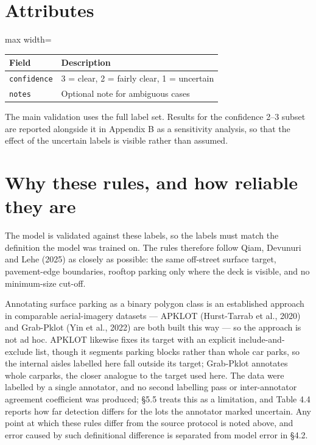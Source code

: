 \hypertarget{attributes}{%
\section{Attributes}\label{attributes}}

\begin{table}[htbp]
\centering
\begin{adjustbox}{max width=\textwidth}
\begin{tabular}{@{}ll@{}}
\toprule
Field & Description \\
\midrule
\texttt{confidence} & 3 = clear, 2 = fairly clear, 1 = uncertain \\
\texttt{notes} & Optional note for ambiguous cases \\
\bottomrule
\end{tabular}
\end{adjustbox}
\end{table}
\restoreparskip

The main validation uses the full label set. Results for the confidence 2--3 subset are reported alongside it in Appendix B as a sensitivity analysis, so that the effect of the uncertain labels is visible rather than assumed.

\hypertarget{why-these-rules-and-how-reliable-they-are}{%
\section{Why these rules, and how reliable they are}\label{why-these-rules-and-how-reliable-they-are}}

The model is validated against these labels, so the labels must match the definition the model was trained on. The rules therefore follow Qiam, Devunuri and Lehe (2025) as closely as possible: the same off-street surface target, pavement-edge boundaries, rooftop parking only where the deck is visible, and no minimum-size cut-off.

Annotating surface parking as a binary polygon class is an established approach in comparable aerial-imagery datasets --- APKLOT (Hurst-Tarrab et al., 2020) and Grab-Pklot (Yin et al., 2022) are both built this way --- so the approach is not ad hoc. APKLOT likewise fixes its target with an explicit include-and-exclude list, though it segments parking blocks rather than whole car parks, so the internal aisles labelled here fall outside its target; Grab-Pklot annotates whole carparks, the closer analogue to the target used here. The data were labelled by a single annotator, and no second labelling pass or inter-annotator agreement coefficient was produced; §5.5 treats this as a limitation, and Table 4.4 reports how far detection differs for the lots the annotator marked uncertain. Any point at which these rules differ from the source protocol is noted above, and error caused by such definitional difference is separated from model error in §4.2.

